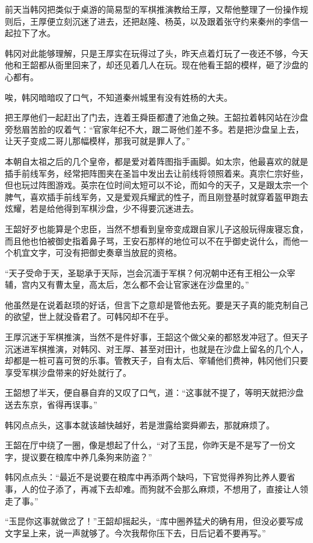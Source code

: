 前天当韩冈把类似于桌游的简易型的军棋推演教给王厚，又帮他整理了一份操作规则后，王厚便立刻沉迷了进去，还把赵隆、杨英，以及跟着张守约来秦州的李信一起拉下了水。

韩冈对此能够理解，只是王厚实在玩得过了头，昨天点着灯玩了一夜还不够，今天他和王韶都从衙里回来了，却还见着几人在玩。现在他看王韶的模样，砸了沙盘的心都有。

唉，韩冈暗暗叹了口气，不知道秦州城里有没有姓杨的大夫。

把王厚他们一起赶出了门去，连着王舜臣都遭了池鱼之殃。王韶拉着韩冈站在沙盘旁愁眉苦脸的叹着气：“官家年纪不大，跟二哥他们差不多。若是把沙盘呈上去，让天子变成二哥儿那幅模样，那我可就是罪人了。”

本朝自太祖之后的几个皇帝，都是爱对着阵图指手画脚。如太宗，他最喜欢的就是插手前线军务，经常把阵图夹在圣旨中发出去让前线将领照着来。真宗仁宗好些，但也玩过阵图游戏。英宗在位时间太短可以不论，而如今的天子，又是跟太宗一个脾气，喜欢插手前线军务，又是爱观兵耀武的性子，而且刚登基时就穿着盔甲跑去炫耀，若是给他得到军棋沙盘，少不得要沉迷进去。

王韶好歹也能算是个忠臣，当然不想看到皇帝变成跟自家儿子这般玩得废寝忘食，而且他也怕被御史指着鼻子骂，王安石那样的地位可以不在乎御史说什么，而他一个机宜文字，可没有把御史奏章当放屁的资格。

“天子受命于天，圣聪承于天际，岂会沉湎于军棋？何况朝中还有王相公一众宰辅，宫内又有曹太皇，高太后，怎么都不会让官家迷在沙盘里的。”

他虽然是在说着赵顼的好话，但言下之意却是管他去死。要是天子真的能克制自己的欲望，世上就没昏君了。可韩冈却不在乎。

王厚沉迷于军棋推演，当然不是件好事，王韶这个做父亲的都怒发冲冠了。但天子沉迷进军棋推演，对韩冈、对王厚、甚至对田计，也就是在沙盘上留名的几个人，却都是一桩可喜可贺的乐事。管教天子，自有太后、宰辅他们费神，韩冈他们只要享受军棋沙盘带来的好处就行了。

王韶想了半天，便自暴自弃的又叹了口气，道：“这事就不提了，等明天就把沙盘送去东京，省得再误事。”

韩冈点点头，这事本就该越快越好，若是泄露给窦舜卿去，那就麻烦了。

王韶在厅中绕了一圈，像是想起了什么，“对了玉昆，你昨天是不是写了一份文字，提议要在粮库中养几条狗来防盗？”

韩冈点点头：“最近不是说要在粮库中再添两个缺吗，下官觉得养狗比养人要省事，人的位子添了，再减下去却难。而狗就不会那么麻烦，不想用了，直接让人领走了事。”

“玉昆你这事就做岔了！”王韶却摇起头，“库中圈养猛犬的确有用，但没必要写成文字呈上来，说一声就够了。今次我帮你压下去，日后记着不要再写。”

